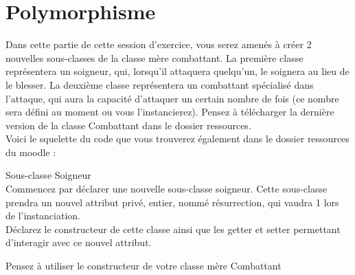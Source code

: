 \section{Polymorphisme}
Dans cette partie de cette session d'exercice, vous serez amenés à créer 2 nouvelles sous-classes de la classe mère combattant. La première classe représentera un soigneur, qui, lorsqu'il attaquera quelqu'un, le soignera au lieu de le blesser. La deuxième classe représentera un combattant spécialisé dans l'attaque, qui aura la capacité d'attaquer un certain nombre de fois (ce nombre sera défini au moment ou vous l'instancierez). Pensez à télécharger la dernière version de la classe Combattant dans le dossier ressources.\\

Voici le squelette du code que vous trouverez également dans le dossier ressources du moodle : \\



\begin{Exercice}[5 minutes] Sous-classe Soigneur \\

Commencez par déclarer une nouvelle sous-classe soigneur. Cette sous-classe prendra un nouvel attribut privé, entier, nommé résurrection, qui vaudra 1 lors de l'instanciation. \\

Déclarez le constructeur de cette classe ainsi que les getter et setter permettant d'interagir avec ce nouvel attribut. \\

\begin{conseil}
Pensez à utiliser le constructeur de votre classe mère Combattant
\end{conseil}

\begin{solution}
	
\end{solution}

\end{Exercice}

